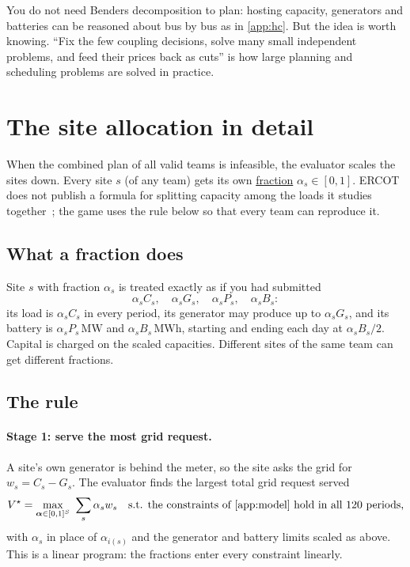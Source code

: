 \documentclass[10pt]{article}
\newcommand{\alert}[1]{{\color{alertblue}\uline{#1}}}
\newcommand{\MW}{\ensuremath{\,\mathrm{MW}}}
\newcommand{\MWh}{\ensuremath{\,\mathrm{MWh}}}
\begin{document}
\begin{keybox}
You do not need Benders decomposition to plan: hosting capacity, generators and
batteries can be reasoned about bus by bus as in \cref{app:hc}. But the idea is
worth knowing. ``Fix the few coupling decisions, solve many small independent
problems, and feed their prices back as cuts'' is how large planning and
scheduling problems are solved in practice.
\end{keybox}


\section{The site allocation in detail}\label{app:projection}

When the combined plan of all valid teams is infeasible, the evaluator scales
the sites down. Every site $s$ (of any team) gets its own \alert{fraction}
$\alpha_s \in [0,1]$. ERCOT does not publish a formula for splitting capacity
among the loads it studies together~\cite{ercot2026batch}; the game uses the
rule below so that every team can reproduce it.

\subsection{What a fraction does}

\begin{keybox}
Site $s$ with fraction $\alpha_s$ is treated exactly as if you had submitted
\[
  \alpha_s C_s,\quad \alpha_s G_s,\quad \alpha_s P_s,\quad \alpha_s B_s :
\]
its load is $\alpha_s C_s$ in every period, its generator may produce up to
$\alpha_s G_s$, and its battery is $\alpha_s P_s$\MW{} and $\alpha_s B_s$\MWh,
starting and ending each day at $\alpha_s B_s/2$. Capital is charged on the
scaled capacities. Different sites of the same team can get different
fractions.
\end{keybox}

\subsection{The rule}

\paragraph{Stage 1: serve the most grid request.} A site's own generator is
behind the meter, so the site asks the grid for $w_s = C_s - G_s$. The
evaluator finds the largest total grid request served
\[
  V^\star = \max_{\boldsymbol\alpha \in [0,1]^S}\ \sum_s \alpha_s w_s
  \quad\text{s.t. the constraints of \cref{app:model} hold in all 120 periods,}
\]
with $\alpha_s$ in place of $\alpha_{i(s)}$ and the generator and battery limits
scaled as above. This is a linear program: the fractions enter every
constraint linearly.
\end{document}
